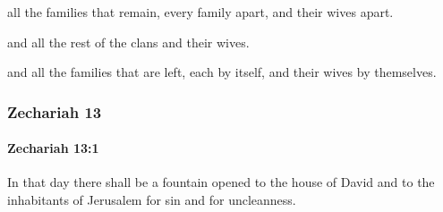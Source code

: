 			\begin{versebox}
					\item[BHS] 
					\item[LXX] 
					\item[ASV] all the families that remain, every family apart, and their wives apart.
					\item[NIV] and all the rest of the clans and their wives.
					\item[NRSV] and all the families that are left, each by itself, and their wives by themselves.
			\end{versebox}
	\subsubsection{Zechariah 13} %
		\label{ZECHARIAH-13}

		\paragraph{Zechariah 13:1} %
			\label{ZECHARIAH-13-1}

			In that day there shall be a fountain opened to the house of David and to the inhabitants of Jerusalem for sin and for uncleanness.

